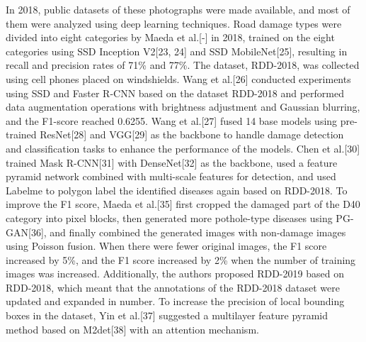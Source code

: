 \documentclass[sensors,article,submit,moreauthors]{Definitions/mdpi}
\begin{document}
    In 2018, public datasets of these photographs were made available, and most of them were analyzed using deep learning techniques. Road damage types were divided into eight categories by Maeda et al.[-]\citep{maeda2018road} in 2018, trained on the eight categories using SSD Inception V2[23, 24]\citep{szegedy2016rethinking,liu2016ssd} and SSD MobileNet[25]\citep{howard2017mobilenet}, resulting in recall and precision rates of 71\% and 77\%. The dataset, RDD-2018, was collected using cell phones placed on windshields. Wang et al.[26]\citep{wang2018road} conducted experiments using SSD and Faster R-CNN based on the dataset RDD-2018 and performed data augmentation operations with brightness adjustment and Gaussian blurring, and the F1-score reached 0.6255. Wang et al.[27]\citep{wang2018deep} fused 14 base models using pre-trained ResNet[28]\citep{He_2016_CVPR} and VGG[29]\citep{vgg} as the backbone to handle damage detection and classification tasks to enhance the performance of the models. Chen et al.[30]\citep{chen2020road} trained Mask R-CNN[31]\citep{He_2017_ICCV} with DenseNet[32]\citep{Huang_2017_CVPR} as the backbone, used a feature pyramid network combined with multi-scale features for detection, and used Labelme to polygon label the identified diseases again based on RDD-2018.
    To improve the F1 score, Maeda et al.[35]\citep{maeda2021generative} first cropped the damaged part of the D40 category into pixel blocks, then generated more pothole-type diseases using PG-GAN[36]\citep{karras2018progressive}, and finally combined the generated images with non-damage images using Poisson fusion. When there were fewer original images, the F1 score increased by 5\%, and the F1 score increased by 2\% when the number of training images was increased. Additionally, the authors proposed RDD-2019 based on RDD-2018, which meant that the annotations of the RDD-2018 dataset were updated and expanded in number. To increase the precision of local bounding boxes in the dataset, Yin et al.[37]\citep{yin2021road} suggested a multilayer feature pyramid method based on M2det[38]\citep{zhao2019m2det} with an attention mechanism.
\end{document}
